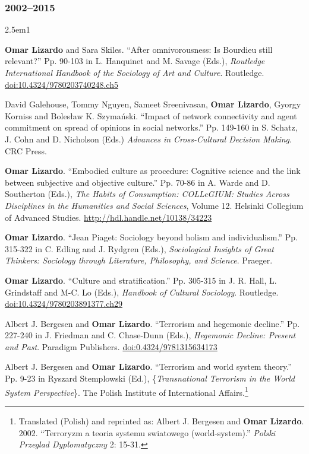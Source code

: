 \documentclass[
]{article}
\newenvironment{cventry}{\begin{hangparas}{2.5em}{1}}{\end{hangparas}}
\begin{document}
\subsubsection{2002--2015}\label{section-17}

\begin{cventry}

\textbf{Omar Lizardo} and Sara Skiles. ``After omnivorousness: Is
Bourdieu still relevant?'' Pp. 90-103 in L. Hanquinet and M. Savage
(Eds.), \emph{Routledge International Handbook of the Sociology of Art
and Culture}. Routledge.
\href{https://www.routledgehandbooks.com/doi/10.4324/9780203740248.ch5}{doi:10.4324/9780203740248.ch5}

David Galehouse, Tommy Nguyen, Sameet Sreenivasan, \textbf{Omar
Lizardo}, Gyorgy Korniss and Bolesław K. Szymański. ``Impact of network
connectivity and agent commitment on spread of opinions in social
networks.'' Pp. 149-160 in S. Schatz, J. Cohn and D. Nicholson (Eds.)
\emph{Advances in Cross-Cultural Decision Making}. CRC Press.

\textbf{Omar Lizardo}. ``Embodied culture as procedure: Cognitive
science and the link between subjective and objective culture.'' Pp.
70-86 in A. Warde and D. Southerton (Eds.), \emph{The Habits of
Consumption: COLLeGIUM: Studies Across Disciplines in the Humanities and
Social Sciences}, Volume 12. Helsinki Collegium of Advanced Studies.
\url{http://hdl.handle.net/10138/34223}

\textbf{Omar Lizardo}. ``Jean Piaget: Sociology beyond holism and
individualism.'' Pp. 315-322 in C. Edling and J. Rydgren (Eds.),
\emph{Sociological Insights of Great Thinkers: Sociology through
Literature, Philosophy, and Science}. Praeger.

\textbf{Omar Lizardo}. ``Culture and stratification.'' Pp. 305-315 in J.
R. Hall, L. Grindstaff and M-C. Lo (Eds.), \emph{Handbook of Cultural
Sociology}. Routledge.
\href{https://www.routledgehandbooks.com/doi/10.4324/9780203891377.ch29}{doi:10.4324/9780203891377.ch29}

Albert J. Bergesen and \textbf{Omar Lizardo}. ``Terrorism and hegemonic
decline.'' Pp. 227-240 in J. Friedman and C. Chase-Dunn (Eds.),
\emph{Hegemonic Decline: Present and Past}. Paradigm Publishers.
\href{https://doi.org/10.4324/9781315634173}{doi:0.4324/9781315634173}

Albert J. Bergesen and \textbf{Omar Lizardo}. ``Terrorism and world
system theory.'' Pp. 9-23 in Ryszard Stemplowski (Ed.),
\{\emph{Transnational Terrorism in the World System Perspective}\}. The
Polish Institute of International Affairs.\footnote{Translated (Polish)
  and reprinted as: Albert J. Bergesen and \textbf{Omar Lizardo}. 2002.
  ``Terroryzm a teoria systemu swiatowego (world-system).'' \emph{Polski
  Przeglad Dyplomatyczny} 2: 15-31.}

\end{cventry}
\end{document}
